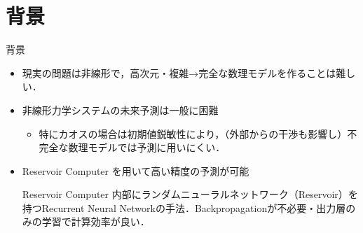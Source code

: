 \section{背景}

\begin{frame}{背景}
    
    \begin{itemize}
        \item 現実の問題は非線形で，高次元・複雑→完全な数理モデルを作ることは難しい．
        \item 非線形力学システムの未来予測は一般に困難
        \begin{itemize}
            \item 特にカオスの場合は初期値鋭敏性により，（外部からの干渉も影響し）不完全な数理モデルでは予測に用いにくい．
        \end{itemize}
        \item Reservoir Computer を用いて高い精度の予測が可能
        \begin{block}{Reservoir Computer}
            内部にランダムニューラルネットワーク（Reservoir）を持つRecurrent Neural Networkの手法．Backpropagationが不必要・出力層のみの学習で計算効率が良い． 
        \end{block}    
    \end{itemize}      
\end{frame}


